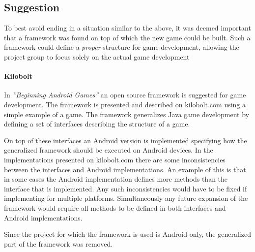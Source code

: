 \subsection{Suggestion}
To best avoid ending in a situation similar to the above, it was deemed important that a framework was found on top of which the new game could be built.
Such a framework could define a \textit{proper} structure for game development, allowing the project group to focus solely on the actual game development

\paragraph{Kilobolt}\label{kilobolt:description}
In \textit{''Beginning Android Games''}\cite{androidgames} an open source framework is suggested for game development.
The framework is presented and described on kilobolt.com\cite{kilobolt} using a simple example of a game.
The framework generalizes Java game development by defining a set of interfaces describing the structure of a game.

On top of these interfaces an Android version is implemented specifying how the generalized framework should be executed on Android devices.
In the implementations presented on kilobolt.com there are some inconsistencies between the interfaces and Android implementations.
An example of this is that in some cases the Android implementation defines more methods than the interface that is implemented.
Any such inconsistencies would have to be fixed if implementing for multiple platforms.
Simultaneously any future expansion of the framework would require all methods to be defined in both interfaces and Android implementations. 

Since the project for which the framework is used is Android-only, the generalized part of the framework was removed.
